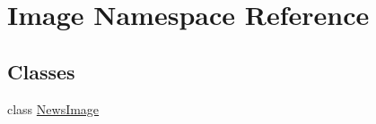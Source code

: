 \hypertarget{namespace_image}{}\section{Image Namespace Reference}
\label{namespace_image}
\subsection*{Classes}
\begin{DoxyCompactItemize}
\item 
class \hyperlink{class_image_1_1_news_image}{News\+Image}
\end{DoxyCompactItemize}
